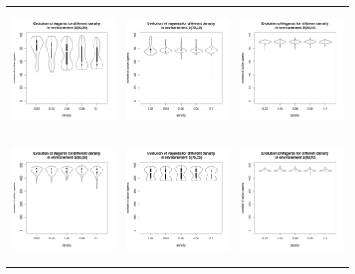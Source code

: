 \documentclass[a4paper]{article}
\begin{document}
\begin{figure}
    \begin{tabular}[H]{ccc}
	\includegraphics[height=4cm]{img/100/agentwrtD-REP50.pdf} &
	\includegraphics[height=4cm]{img/100/agentwrtD-REP75.pdf} &
	\includegraphics[height=4cm]{img/100/agentwrtD-REP90.pdf} \\
	\includegraphics[height=4cm]{img/500/agentwrtD-REP50.pdf} &
	\includegraphics[height=4cm]{img/500/agentwrtD-REP75.pdf} &
	\includegraphics[height=4cm]{img/500/agentwrtD-REP90.pdf} \\

\end{tabular}
\end{figure}
\end{document}
